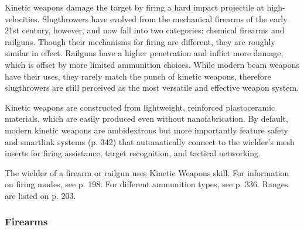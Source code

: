 Kinetic weapons damage the target by firing a hard 
impact projectile at high-velocities. Slugthrowers 
have evolved from the mechanical firearms of the 
early 21st century, however, and now fall into two 
categories: chemical firearms and railguns. Though 
their mechanisms for firing are different, they are 
roughly similar in effect. Railguns have a higher 
penetration and inflict more damage, which is offset 
by more limited ammunition choices. While modern 
beam weapons have their uses, they rarely match the 
punch of kinetic weapons, therefore slugthrowers 
are still perceived as the most versatile and effective 
weapon system.

Kinetic weapons are constructed from lightweight, 
reinforced plastoceramic materials, which are easily 
produced even without nanofabrication. By default, 
modern kinetic weapons are ambidextrous but more 
importantly feature safety and smartlink systems (p. 
342) that automatically connect to the wielder's mesh 
inserts for firing assistance, target recognition, and 
tactical networking.

The wielder of a firearm or railgun uses Kinetic 
Weapons skill. For information on firing modes, see 
p. 198. For different ammunition types, see p. 336. 
Ranges are listed on p. 203.

\subsubsection{Firearms}

